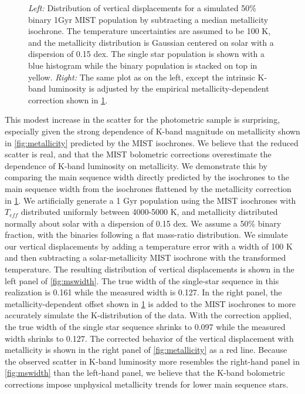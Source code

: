 \documentclass[manuscript]{aastex6}
\newcommand{\Teff}{\ensuremath{T_{eff}}}
\begin{document}
\begin{figure}[htb]
    \centering
    \caption{\emph{Left:} Distribution of vertical displacements for a
        simulated 50\% binary 1Gyr MIST population by subtracting a median 
        metallicity isochrone. The temperature uncertainties are assumed to be 
        100 K, and the metallicity distribution is Gaussian centered on solar 
        with a dispersion of 0.15 dex. The single star population is shown 
        with a blue histogram while the binary population is stacked on top in 
    yellow. \emph{Right:} The same plot as on the left, except the intrinsic
K-band luminosity is adjusted by the empirical metallicity-dependent correction
shown in \cref{fig:met_trend}.}
    \label{fig:met_trend}
\end{figure}

This modest increase in the scatter for the photometric sample is surprising,
especially given the strong dependence of K-band magnitude on metallicity shown
in \cref{fig:metallicity} predicted by the MIST isochrones. We believe that the
reduced scatter is real, and that the MIST bolometric corrections overestimate 
the dependence of K-band luminosity on metallicity. We demonstrate this by
comparing the main sequence width directly predicted by the isochrones to the
main sequence width from the isochrones flattened by the metallicity correction
in \cref{fig:met_trend}. We artificially generate a 1 Gyr population using the
MIST isochrones with \Teff{} distributed uniformly between 4000-5000 K, and
metallicity distributed normally about solar with a dispersion of 0.15 dex. We
assume a 50\% binary fraction, with the binaries following a flat mass-ratio
distribution. We simulate our vertical displacements by adding a temperature 
error with a width of 100 K and then subtracting a solar-metallicity MIST
isochrone with the transformed temperature. The resulting distribution of
vertical displacements is shown in the left panel of \cref{fig:mswidth}. The
true width of the single-star sequence in this realization is 0.161 while the
measured width is 0.127. In the right panel, the metallicity-dependent offset
shown in \cref{fig:met_trend} is added to the MIST isochrones to more
accurately simulate the K-distribution of the data. With the correction
applied, the true width of the single star sequence shrinks to 0.097 while the
measured width shrinks to 0.127. The corrected behavior of the vertical
displacement with metallicity is shown in the right panel of 
\cref{fig:metallicity} as a red line. Because the observed scatter in K-band
luminosity more resembles the right-hand panel in \cref{fig:mswidth} than the
left-hand panel, we believe that the K-band bolometric corrections impose 
unphysical metallicity trends for lower main sequence stars.
\end{document}
